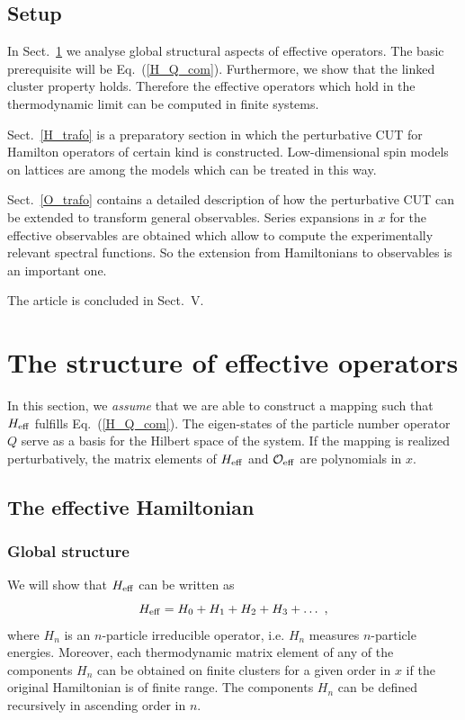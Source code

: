 \subsection{Setup}
In Sect.~\ref{lct} we analyse global structural aspects of
effective operators. The basic prerequisite will be Eq.~(\ref{H_Q_com}).
Furthermore, we show that the linked cluster property holds.
Therefore the effective operators which hold in
the thermodynamic limit can be computed in finite systems.

Sect.~\ref{H_trafo} is a preparatory section in which
the perturbative CUT for Hamilton operators of 
certain kind is constructed. Low-dimensional spin models on lattices
are among the models which can be treated in this way.

Sect.~\ref{O_trafo} contains a detailed
description of how the perturbative CUT can be extended to transform
general observables. Series expansions in $x$ for the
effective observables are obtained which allow to compute
the experimentally relevant spectral functions.
So the extension from Hamiltonians to observables is an important one.

The article is concluded in Sect.\ V.


\section{The structure of effective operators}
\label{lct}
In this section, we {\em assume} that we are able to 
construct a mapping such that $H_{\rm eff}$ fulfills
Eq.~(\ref{H_Q_com}). The eigen-states of the particle number operator
$Q$ serve as a basis for the Hilbert space of 
the system. If the  mapping is realized perturbatively, the matrix
elements of $H_{\rm eff}$ and ${\mathcal O}_{\rm eff}$
 are polynomials in $x$. 

\subsection{The effective Hamiltonian}
\label{H_eff_general}
\subsubsection{Global structure}
 We will show that $H_{\rm eff}$ can be written as
\begin{equation}
  \label{H_hauptzerl}
  H_{\rm eff}=H_0+H_1+H_2+H_3+\ldots\ ,
\end{equation}
where $H_n$ is an $n$-particle irreducible operator, i.e. $H_n$ measures
$n$-particle energies.
 Moreover, each thermodynamic matrix element of any of the components $H_n$ 
can be obtained on finite clusters for a given order in $x$
if the original Hamiltonian is of finite range. 
The components $H_n$ can be defined recursively in 
ascending order in $n$.  

